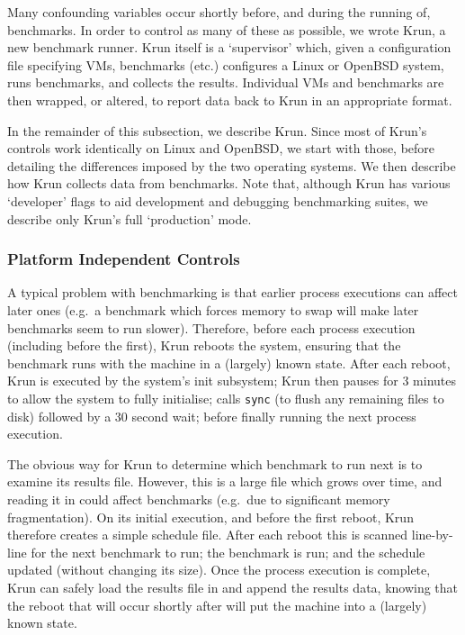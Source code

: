 \documentclass[preprint,numbers,10pt]{sigplanconf}
\newcommand{\krun}{Krun\xspace}
\begin{document}
Many confounding variables occur shortly before, and during the running of,
benchmarks. In order to control as many of these as possible, we wrote
\krun, a new benchmark runner. \krun itself is a `supervisor'
which, given a configuration file specifying VMs, benchmarks (etc.) configures
a Linux or OpenBSD system, runs benchmarks, and collects the results. Individual VMs and benchmarks
are then wrapped, or altered, to report data back to \krun in an appropriate format.

In the remainder of this subsection, we describe \krun. Since most of \krun's
controls work identically on Linux and OpenBSD, we start with those,
before detailing the differences imposed by the two operating systems. We then
describe how \krun collects data from benchmarks.
Note that, although \krun has various `developer' flags to aid development
and debugging benchmarking suites, we describe only \krun's full `production' mode.


\subsubsection{Platform Independent Controls}

A typical problem with benchmarking is that earlier process executions can
affect later ones (e.g.~a benchmark which forces memory to swap will make
later benchmarks seem to run slower). Therefore, before each process execution
(including before the first), \krun reboots the system, ensuring that the
benchmark runs with the machine in a (largely) known state. After each reboot, \krun is
executed by the system's init subsystem; \krun then pauses for 3
minutes to allow the system to fully initialise; calls \texttt{sync} (to
flush any remaining files to disk) followed by a 30 second wait; before finally running the
next process execution.

The obvious way for \krun to determine which benchmark to run next is to examine
its results file. However, this is a large file which grows over time, and
reading it in could affect benchmarks (e.g.~due to significant memory
fragmentation). On its initial execution, and before the first reboot, \krun
therefore creates a simple schedule file. After each reboot this is scanned
line-by-line for the next benchmark to run; the benchmark is run; and the schedule
updated (without changing its size). Once the process execution is
complete, \krun can safely load the results file in and append the results data,
knowing that the reboot that will occur shortly after will put the machine into
a (largely) known state.
\end{document}
